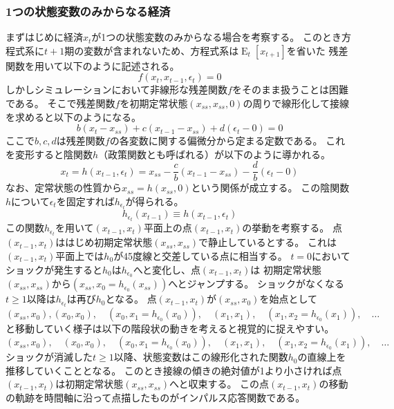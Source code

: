\subsubsection{1つの状態変数のみからなる経済}
\label{sec:chapter4_method_single_variable}
まずはじめに経済\(x_t\)が1つの状態変数のみからなる場合を考察する。
このとき方程式系に\(t+1\)期の変数が含まれないため、方程式系は\(\operatorname{E}_t[x_{t+1}]\)を省いた
残差関数を用いて以下のように記述される。
\begin{equation}
\label{form:chapter4_method_single_system}
    f(x_t,x_{t-1},\epsilon_t)=0
\end{equation}
しかしシミュレーションにおいて非線形な残差関数\(f\)をそのまま扱うことは困難である。
そこで残差関数\(f\)を初期定常状態\((x_{ss},x_{ss},0)\)の周りで線形化して接線を求めると以下のようになる。
\begin{equation}
\label{form:chapter4_method_linearized_single}
    b(x_t-x_{ss})+c(x_{t-1}-x_{ss})+d(\epsilon_t-0)=0
\end{equation}
ここで\(b,c,d\)は残差関数\(f\)の各変数に関する偏微分から定まる定数である。
これを変形すると陰関数\(h\)（政策関数とも呼ばれる）が以下のように導かれる。
\begin{equation}
\label{form:chapter4_method_implicit_h_single}
    x_t=h(x_{t-1},\epsilon_t)=x_{ss}-\frac{c}{b}(x_{t-1}-x_{ss})-\frac{d}{b}(\epsilon_t-0)
\end{equation}
なお、定常状態の性質から\(x_{ss}=h(x_{ss},0)\)という関係が成立する。
この陰関数\(h\)について\(\epsilon_t\)を固定すれば\(h_{\epsilon_t}\)が得られる。
\begin{equation}
\label{form:chapter4_method_h_epsilon_single}
    h_{\epsilon_t}(x_{t-1})\equiv h(x_{t-1},\epsilon_t)
\end{equation}
この関数\(h_{\epsilon_t}\)を用いて\((x_{t-1},x_t)\)平面上の点\((x_{t-1},x_t)\)の挙動を考察する。
点\((x_{t-1},x_t)\)ははじめ初期定常状態\((x_{ss},x_{ss})\)で静止しているとする。
これは\((x_{t-1},x_t)\)平面上では\(h_0\)が45度線と交差している点に相当する。
\(t=0\)においてショックが発生すると\(h_0\)は\(h_{\epsilon_0}\)へと変化し、点\((x_{t-1},x_t)\)は
初期定常状態\((x_{ss},x_{ss})\)から\((x_{ss},x_0=h_{\epsilon_0}(x_{ss}))\)へとジャンプする。
ショックがなくなる\(t\ge1\)以降は\(h_{\epsilon_t}\)は再び\(h_0\)となる。
点\((x_{t-1},x_t)\)が\((x_{ss},x_0)\)を始点として
\((x_{ss},x_0), 
  (x_0,x_0),\quad (x_0,x_1=h_{\epsilon_0}(x_0)),\quad
  (x_1,x_1),\quad (x_1,x_2=h_{\epsilon_0}(x_1)),\quad\dots\)
と移動していく様子は以下の階段状の動きを考えると視覚的に捉えやすい。
\begin{equation}
\label{form:chapter4_method_iterative_convergence}
    (x_{ss},x_0),\quad
    (x_0,x_0),\quad (x_0,x_1=h_{\epsilon_0}(x_0)),\quad
    (x_1,x_1),\quad (x_1,x_2=h_{\epsilon_0}(x_1)),\quad\dots
\end{equation}
ショックが消滅した\(t\ge1\)以降、状態変数はこの線形化された関数\(h_0\)の直線上を推移していくこととなる。
このとき接線の傾きの絶対値が1より小さければ点\((x_{t-1},x_t)\)は初期定常状態\((x_{ss},x_{ss})\)へと収束する。
この点\((x_{t-1},x_t)\)の移動の軌跡を時間軸に沿って点描したものがインパルス応答関数である。


